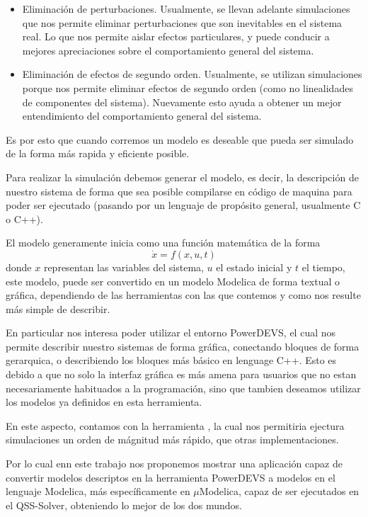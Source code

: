 \begin{itemize}
	\item Eliminación de perturbaciones. Usualmente, se llevan adelante simulaciones que nos permite eliminar perturbaciones que son inevitables en el sistema real. Lo que nos permite aislar efectos particulares, y puede conducir a mejores apreciaciones sobre el comportamiento general del sistema.

	\item Eliminación de efectos de segundo orden. Usualmente, se utilizan simulaciones porque nos permite eliminar efectos de segundo orden (como no linealidades de componentes del sistema). Nuevamente esto ayuda a obtener un mejor entendimiento del comportamiento general del sistema.
\end{itemize}

Es por esto que cuando corremos un modelo es deseable que pueda ser simulado de la forma más rapida y eficiente posible.

Para realizar la simulación debemos generar el modelo, es decir, la descripción de nuestro sistema de forma que sea posible compilarse en código de maquina para poder ser ejecutado (pasando por un lenguaje de propósito general, usualmente C o C++). 

El modelo generamente inicia como una función matemática de la forma 
\begin{equation*}
	\dot{x} = f(x, u, t)
\end{equation*}
donde $x$ representan las variables del sistema, $u$ el estado inicial y $t$ el tiempo, este modelo, puede ser convertido en un modelo Modelica de forma textual o gráfica, dependiendo de las herramientas con las que contemos y como nos resulte más simple de describir.

En particular nos interesa poder utilizar el entorno PowerDEVS, el cual nos permite describir nuestro sistemas de forma gráfica, conectando bloques de forma gerarquica, o describiendo los bloques más básico en lenguage C++. 
Esto es debido a que no solo la interfaz gráfica es más amena para usuarios que no estan necesariamente habituados a la programación, sino que tambien deseamos utilizar los modelos ya definidos en esta herramienta.

En este aspecto, contamos con la herramienta , la cual nos permitiria ejectura simulaciones un orden de mágnitud más rápido, que otras implementaciones.

Por lo cual enn este trabajo nos proponemos mostrar una aplicación capaz de convertir modelos descriptos en la herramienta PowerDEVS\cite{BK11} a modelos en el lenguaje Modelica\cite{Fritzson02modelica--}, más específicamente en $\mu$Modelica\cite{Ber12}, capaz de ser ejecutados en el QSS-Solver, obteniendo lo mejor de los dos mundos.


